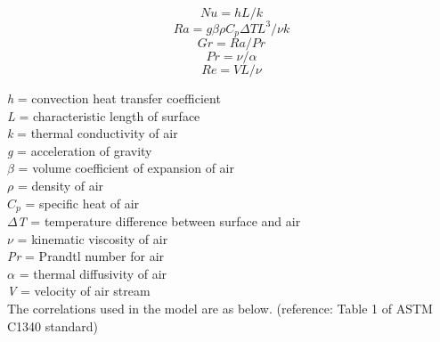 \begin{equation}
Nu = hL/k
\end{equation}
\begin{equation}
Ra = g \beta \rho C_p \Delta TL^3 / \nu k
\end{equation}
\begin{equation}
Gr = Ra / Pr
\end{equation}
\begin{equation}
Pr = \nu / \alpha
\end{equation}
\begin{equation}
Re = VL/ \nu
\end{equation}

\noindent
\emph{h} = convection heat transfer coefficient \\
\emph{L} = characteristic length of surface \\
\emph{k} = thermal conductivity of air \\
\emph{g} = acceleration of gravity \\
$\beta$ = volume coefficient of expansion of air\\
$\rho$ = density of air\\
$C_p$ = specific heat of air\\
\emph{$\Delta$T} = temperature difference between surface and air\\
$\nu$ = kinematic viscosity of air\\
\emph{Pr} = Prandtl number for air\\
$\alpha$ = thermal diffusivity of air\\
\emph{V} = velocity of air stream\\

The correlations used in the model are as below. (reference: Table 1 of ASTM C1340 standard)

